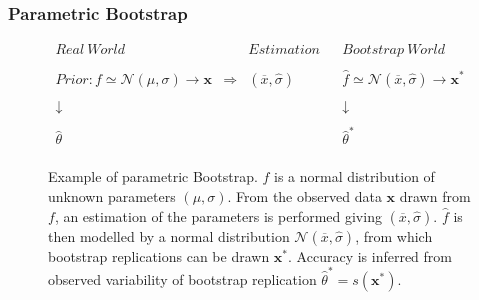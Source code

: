 \frame
{
\frametitle{Parametric Bootstrap}

\begin{figure}[!h]
$$
\begin{array}{rcccr}
Real\ World & & Estimation & & Bootstrap\ World \\
&&&&\\
Prior: f\simeq \mathcal{N}(\mu,\sigma) \rightarrow \mathbf{x}  & \Rightarrow & (\overline{x},\hat{\sigma})& & \hat{f}\simeq\mathcal{N}(\overline{x},\hat{\sigma}) \rightarrow \mathbf{x}^{*} \\
&&&&\\
\downarrow &&& & \downarrow \ \\
&&&&\\
\hat{\theta} && & & \hat{\theta}^{*}\\
\end{array} 
$$
\caption{Example of parametric Bootstrap. $f$ is a normal distribution of unknown parameters $(\mu, \sigma)$. From the observed data $\mathbf{x}$ drawn from $f$, an estimation of the parameters  is performed giving $(\overline{x},\hat{\sigma})$.
$\hat{f}$ is then modelled by a normal distribution $\mathcal{N}(\overline{x},\hat{\sigma})$, from which bootstrap replications can be drawn $\mathbf{x}^{*}$.  Accuracy is inferred from observed variability of bootstrap replication $\hat{\theta}^{*}=s(\mathbf{x}^{*})$.}
\end{figure}
}
